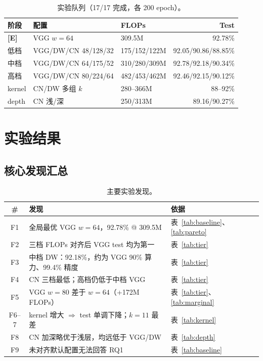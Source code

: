 \documentclass{article}
\newcommand{\grade}[1]{\textbf{\textcolor{blue!70!black}{[#1]}}}
\begin{document}
\begin{CJK}{UTF8}{gbsn}
\begin{table}[t]
  \caption{实验队列（17/17 完成，各 200 epoch）。}
  \label{tab:queue}
  \centering
  \scriptsize
  \setlength{\tabcolsep}{1.5pt}
  \begin{tabular}{@{}lllr@{}}
    \toprule
    阶段 & 配置 & FLOPs & Test \\
    \midrule
    \grade{E} & VGG $w{=}64$ & 309.5M & 92.78\% \\
    低档 & VGG/DW/CN 48/128/32 & 175/152/122M & 92.05/90.86/88.85\% \\
    中档 & VGG/DW/CN 64/175/52 & 310/280/309M & 92.78/92.18/90.34\% \\
    高档 & VGG/DW/CN 80/224/64 & 482/453/462M & 92.46/92.15/90.12\% \\
    kernel & CN/DW 多组 $k$ & 280--366M & 88--92\% \\
    depth & CN 浅/深 & 250/313M & 89.16/90.27\% \\
    \bottomrule
  \end{tabular}
\end{table}

\section{实验结果}
\label{sec:results}

\subsection{核心发现汇总}

\begin{table}[t]
  \caption{主要实验发现。}
  \label{tab:findings}
  \centering
  \footnotesize
  \begin{tabularx}{\linewidth}{@{}c l Y@{}}
    \toprule
    \# & 发现 & 依据 \\
    \midrule
    F1 & 全局最优 VGG $w{=}64$，92.78\% @ 309.5M & 表~\ref{tab:baseline}、\ref{tab:pareto} \\
    F2 & 三档 FLOPs 对齐后 VGG test 均为第一 & 表~\ref{tab:tier} \\
    F3 & 中档 DW：92.18\%，约为 VGG 90\% 算力、99.4\% 精度 & 表~\ref{tab:tier} \\
    F4 & CN 三档最低；高档仍低于中档 VGG & 表~\ref{tab:tier} \\
    F5 & VGG $w{=}80$ 差于 $w{=}64$（+172M FLOPs） & 表~\ref{tab:tier}、\ref{tab:marginal} \\
    F6--7 & kernel 增大 $\Rightarrow$ test 单调下降；$k{=}11$ 最差 & 表~\ref{tab:kernel} \\
    F8 & CN 加深略优于浅层，均远低于 VGG/DW & 表~\ref{tab:depth} \\
    F9 & 未对齐默认配置无法回答 RQ1 & 表~\ref{tab:baseline} \\
    \bottomrule
  \end{tabularx}
\end{table}


\end{CJK}
\end{document}
